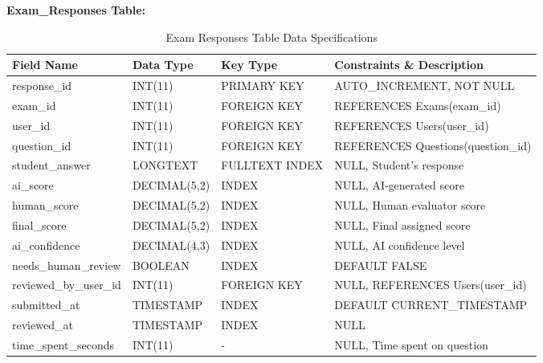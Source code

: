 \documentclass[12pt,a4paper,oneside]{book}
\begin{document}
\textbf{Exam\_Responses Table:}
\begin{table}[H]
\centering
\caption{Exam Responses Table Data Specifications}
\footnotesize
\begin{tabular}{|L{3cm}|L{2.5cm}|L{1.5cm}|L{5cm}|}
\hline
\textbf{Field Name} & \textbf{Data Type} & \textbf{Key Type} & \textbf{Constraints \& Description} \\
\hline
response\_id & INT(11) & PRIMARY KEY & AUTO\_INCREMENT, NOT NULL \\
\hline
exam\_id & INT(11) & FOREIGN KEY & REFERENCES Exams(exam\_id) \\
\hline
user\_id & INT(11) & FOREIGN KEY & REFERENCES Users(user\_id) \\
\hline
question\_id & INT(11) & FOREIGN KEY & REFERENCES Questions(question\_id) \\
\hline
student\_answer & LONGTEXT & FULLTEXT INDEX & NULL, Student's response \\
\hline
ai\_score & DECIMAL(5,2) & INDEX & NULL, AI-generated score \\
\hline
human\_score & DECIMAL(5,2) & INDEX & NULL, Human evaluator score \\
\hline
final\_score & DECIMAL(5,2) & INDEX & NULL, Final assigned score \\
\hline
ai\_confidence & DECIMAL(4,3) & INDEX & NULL, AI confidence level \\
\hline
needs\_human\_review & BOOLEAN & INDEX & DEFAULT FALSE \\
\hline
reviewed\_by\_user\_id & INT(11) & FOREIGN KEY & NULL, REFERENCES Users(user\_id) \\
\hline
submitted\_at & TIMESTAMP & INDEX & DEFAULT CURRENT\_TIMESTAMP \\
\hline
reviewed\_at & TIMESTAMP & INDEX & NULL \\
\hline
time\_spent\_seconds & INT(11) & - & NULL, Time spent on question \\
\hline
\end{tabular}
\end{table}
\end{document}
